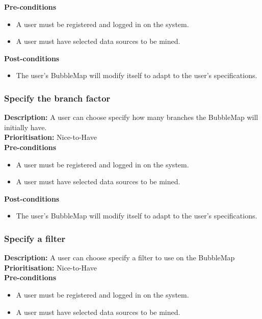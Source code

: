 \documentclass[hidelinks,english]{article}
\begin{document}
    
      \textbf{Pre-conditions}
    \begin{itemize}
        \item A user must be registered and logged in on the system.
        \item A user must have selected data sources to be mined.
    \end{itemize}
    
    \textbf{Post-conditions}
     \begin{itemize}
        \item The user's BubbleMap will modify itself to adapt to the user's specifications.
    \end{itemize}
    
    \subsubsection{Specify the branch factor}
	\textbf{Description:}  A user can choose specify how many branches the BubbleMap will initially have.
	\\
    \textbf{Prioritisation:} Nice-to-Have\\
    
    
      \textbf{Pre-conditions}
    \begin{itemize}
        \item A user must be registered and logged in on the system.
        \item A user must have selected data sources to be mined.
    \end{itemize}
    
    \textbf{Post-conditions}
     \begin{itemize}
        \item The user's BubbleMap will modify itself to adapt to the user's specifications.
    \end{itemize}
    
    \subsubsection{Specify a filter}
	\textbf{Description:}  A user can choose specify a filter to use on the BubbleMap
	\\
    \textbf{Prioritisation:} Nice-to-Have\\
    
    
      \textbf{Pre-conditions}
    \begin{itemize}
        \item A user must be registered and logged in on the system.
        \item A user must have selected data sources to be mined.
    \end{itemize}
    
\end{document}
